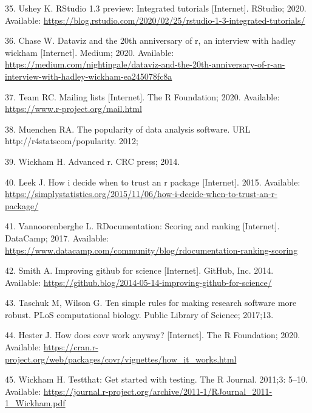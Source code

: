 \documentclass[10pt,letterpaper]{article}
\begin{document}
\leavevmode\hypertarget{ref-ushey2020}{}%
35. Ushey K. RStudio 1.3 preview: Integrated tutorials {[}Internet{]}.
RStudio; 2020. Available:
\url{https://blog.rstudio.com/2020/02/25/rstudio-1-3-integrated-tutorials/}

\leavevmode\hypertarget{ref-chase2020}{}%
36. Chase W. Dataviz and the 20th anniversary of r, an interview with
hadley wickham {[}Internet{]}. Medium; 2020. Available:
\url{https://medium.com/nightingale/dataviz-and-the-20th-anniversary-of-r-an-interview-with-hadley-wickham-ea245078fc8a}

\leavevmode\hypertarget{ref-Rmail2020}{}%
37. Team RC. Mailing lists {[}Internet{]}. The R Foundation; 2020.
Available: \url{https://www.r-project.org/mail.html}

\leavevmode\hypertarget{ref-muenchen2012}{}%
38. Muenchen RA. The popularity of data analysis software. URL
http://r4statscom/popularity. 2012;

\leavevmode\hypertarget{ref-wickham2014}{}%
39. Wickham H. Advanced r. CRC press; 2014.

\leavevmode\hypertarget{ref-leek2015}{}%
40. Leek J. How i decide when to trust an r package {[}Internet{]}.
2015. Available:
\url{https://simplystatistics.org/2015/11/06/how-i-decide-when-to-trust-an-r-package/}

\leavevmode\hypertarget{ref-vannoorenberghe2017}{}%
41. Vannoorenberghe L. RDocumentation: Scoring and ranking
{[}Internet{]}. DataCamp; 2017. Available:
\url{https://www.datacamp.com/community/blog/rdocumentation-ranking-scoring}

\leavevmode\hypertarget{ref-smith2014}{}%
42. Smith A. Improving github for science {[}Internet{]}. GitHub, Inc.
2014. Available:
\url{https://github.blog/2014-05-14-improving-github-for-science/}

\leavevmode\hypertarget{ref-taschuk2017}{}%
43. Taschuk M, Wilson G. Ten simple rules for making research software
more robust. PLoS computational biology. Public Library of Science;
2017;13.

\leavevmode\hypertarget{ref-hester2020}{}%
44. Hester J. How does covr work anyway? {[}Internet{]}. The R
Foundation; 2020. Available:
\url{https://cran.r-project.org/web/packages/covr/vignettes/how_it_works.html}

\leavevmode\hypertarget{ref-wickham2011}{}%
45. Wickham H. Testthat: Get started with testing. The R Journal.
2011;3: 5--10. Available:
\url{https://journal.r-project.org/archive/2011-1/RJournal_2011-1_Wickham.pdf}
\end{document}
